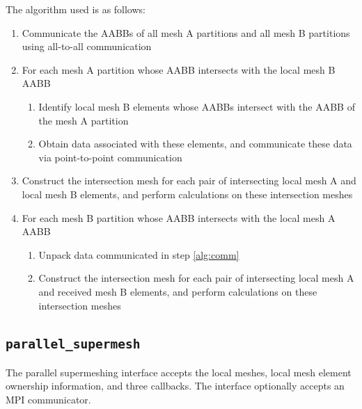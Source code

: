 \documentclass{article}
\begin{document}
The algorithm used is as follows:
\begin{enumerate}
  \item Communicate the AABBs of all mesh A partitions and all mesh B partitions
        using all-to-all communication
  \item For each mesh A partition whose AABB intersects with the local mesh B
        AABB
  \begin{enumerate}
    \item Identify local mesh B elements whose AABBs intersect with the AABB of
          the mesh A partition
    \item \label{alg:comm} Obtain data associated with these elements, and
          communicate these data via point-to-point communication
  \end{enumerate}
  \item Construct the intersection mesh for each pair of intersecting local
        mesh A and local mesh B elements, and perform calculations on these
        intersection meshes
  \item For each mesh B partition whose AABB intersects with the local mesh A
        AABB
  \begin{enumerate}
    \item Unpack data communicated in step \ref{alg:comm}
    \item Construct the intersection mesh for each pair of intersecting local
          mesh A and received mesh B elements, and perform calculations on these 
          intersection meshes
  \end{enumerate}
\end{enumerate}  

\subsection{\texttt{parallel\_supermesh}}

The parallel supermeshing interface accepts the local meshes, local mesh
element ownership information, and three callbacks. The interface optionally
accepts an MPI communicator.
\end{document}
